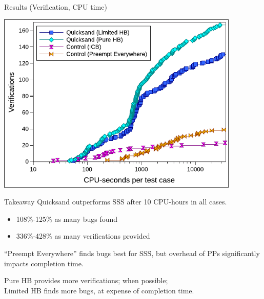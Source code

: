\documentclass[xcolor=dvipsnames]{beamer}
\begin{document}
\begin{frame}{Results (Verification, CPU time)}
	\begin{center}
	\vspace{-0.8em}
	\includegraphics[width=0.87\textwidth]{verifs-talk.pdf}
	\end{center}
\end{frame}

\begin{frame}{Takeaway}
	Quicksand outperforms SSS after 10 CPU-hours in all cases.
	\begin{itemize}
		\item 108\%-125\% as many bugs found
		\item 336\%-428\% as many verifications provided
	\end{itemize}
	\linegap

	``Preempt Everywhere'' finds bugs best for SSS, but overhead of PPs significantly impacts completion time.
	\linegap

	Pure HB provides more verifications; when possible; \\
	Limited HB finds more bugs, at expense of completion time.
\end{frame}



\end{document}
